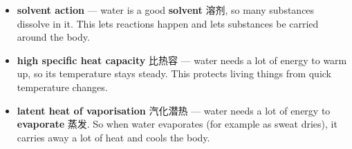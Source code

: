 \documentclass[11pt]{article}
\begin{document}
\begin{itemize}
\item \textbf{solvent action} — water is a good \textbf{solvent} 溶剂, so many substances dissolve in it. This lets reactions happen and lets substances be carried around the body.

\item \textbf{high specific heat capacity} 比热容 — water needs a lot of energy to warm up, so its temperature stays steady. This protects living things from quick temperature changes.

\item \textbf{latent heat of vaporisation} 汽化潜热 — water needs a lot of energy to \textbf{evaporate} 蒸发. So when water evaporates (for example as sweat dries), it carries away a lot of heat and cools the body.

\end{itemize}
\end{document}
